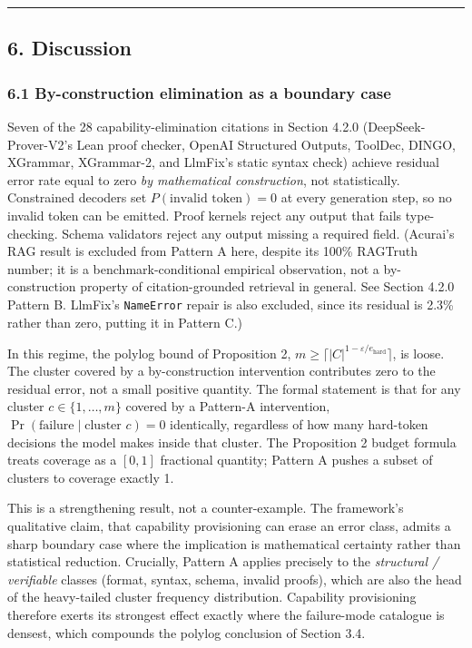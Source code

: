 \documentclass[
]{article}
\begin{document}
\begin{center}\rule{0.5\linewidth}{0.5pt}\end{center}

\subsection{6. Discussion}\label{discussion}

\subsubsection{6.1 By-construction elimination as a boundary
case}\label{by-construction-elimination-as-a-boundary-case}

Seven of the 28 capability-elimination citations in Section 4.2.0
(DeepSeek-Prover-V2's Lean proof checker, OpenAI Structured Outputs,
ToolDec, DINGO, XGrammar, XGrammar-2, and LlmFix's static syntax check)
achieve residual error rate equal to zero \emph{by mathematical
construction}, not statistically. Constrained decoders set
\(P(\text{invalid token}) = 0\) at every generation step, so no invalid
token can be emitted. Proof kernels reject any output that fails
type-checking. Schema validators reject any output missing a required
field. (Acurai's RAG result is excluded from Pattern A here, despite its
100\% RAGTruth number; it is a benchmark-conditional empirical
observation, not a by-construction property of citation-grounded
retrieval in general. See Section 4.2.0 Pattern B. LlmFix's
\texttt{NameError} repair is also excluded, since its residual is 2.3\%
rather than zero, putting it in Pattern C.)

In this regime, the polylog bound of Proposition 2,
\(m \geq \lceil |C|^{1 - \varepsilon / e_{\text{hard}}} \rceil\), is
loose. The cluster covered by a by-construction intervention contributes
zero to the residual error, not a small positive quantity. The formal
statement is that for any cluster \(c \in \{1, \dots, m\}\) covered by a
Pattern-A intervention,
\(\Pr(\text{failure} \mid \text{cluster } c) = 0\) identically,
regardless of how many hard-token decisions the model makes inside that
cluster. The Proposition 2 budget formula treats coverage as a
\([0, 1]\) fractional quantity; Pattern A pushes a subset of clusters to
coverage exactly 1.

This is a strengthening result, not a counter-example. The framework's
qualitative claim, that capability provisioning can erase an error
class, admits a sharp boundary case where the implication is
mathematical certainty rather than statistical reduction. Crucially,
Pattern A applies precisely to the \emph{structural / verifiable}
classes (format, syntax, schema, invalid proofs), which are also the
head of the heavy-tailed cluster frequency distribution. Capability
provisioning therefore exerts its strongest effect exactly where the
failure-mode catalogue is densest, which compounds the polylog
conclusion of Section 3.4.
\end{document}
